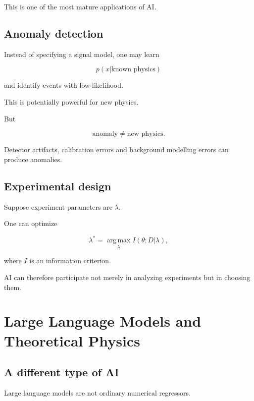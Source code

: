 \documentclass[11pt,a4paper,oneside]{book}
\begin{document}
This is one of the most mature applications of AI.

\section{Anomaly detection}

Instead of specifying a signal model, one may learn

\begin{equation}
p(x|\text{known physics})
\end{equation}

and identify events with low likelihood.

This is potentially powerful for new physics.

But

\begin{equation}
\text{anomaly}
\neq
\text{new physics}.
\end{equation}

Detector artifacts, calibration errors and background modelling errors can
produce anomalies.

\section{Experimental design}

Suppose experiment parameters are $\lambda$.

One can optimize

\begin{equation}
\lambda^\ast
=
\operatorname*{arg\,max}_{\lambda}
I(\theta;D|\lambda),
\end{equation}

where $I$ is an information criterion.

AI can therefore participate not merely in analyzing experiments but in
choosing them.

\chapter{Large Language Models and Theoretical Physics}

\section{A different type of AI}

Large language models are not ordinary numerical regressors.
\end{document}
